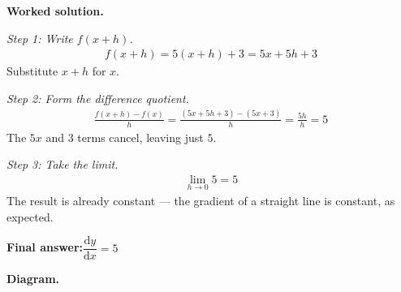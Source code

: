 \documentclass[11pt]{article}
\begin{document}
\textbf{Worked solution.}

\textit{Step 1: Write \( f(x+h) \).}
\[\begin{gathered}
f(x+h) = 5(x+h) + 3 = 5x + 5h + 3
\end{gathered}\]
Substitute \( x + h \) for \( x \).

\textit{Step 2: Form the difference quotient.}
\[\begin{gathered}
\frac{f(x+h) - f(x)}{h} = \frac{(5x + 5h + 3) - (5x + 3)}{h} = \frac{5h}{h} = 5
\end{gathered}\]
The \( 5x \) and \( 3 \) terms cancel, leaving just \( 5 \).

\textit{Step 3: Take the limit.}
\[\begin{gathered}
\lim_{h \to 0} 5 = 5
\end{gathered}\]
The result is already constant --- the gradient of a straight line is constant, as expected.

\begin{answerbox}
\textbf{Final answer:}\quad \(\displaystyle  \dfrac{\mathrm{d}y}{\mathrm{d}x} = 5 \)
\end{answerbox}
\textbf{Diagram.}
\end{document}
